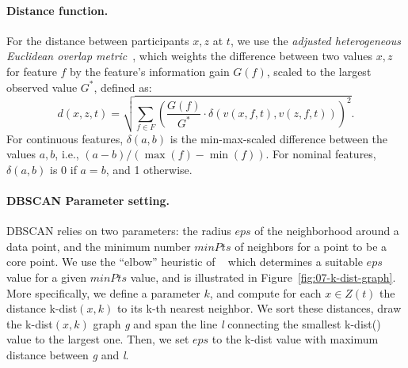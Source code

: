 \documentclass[
  oneside]{book}
\begin{document}
\paragraph*{Distance function.}

For the distance between participants \(x,z\) at \(t\), we use the \emph{adjusted heterogeneous Euclidean overlap metric}~\autocite{HielscherEtAl:IDA14,Wilson97}, which weights the difference between two values \(x,z\) for feature \(f\) by the feature's information gain \(G(f)\), scaled to the largest observed value \(G^*\), defined as:
\begin{equation}
d(x,z,t)=\sqrt{\sum_{f \in F} \left(\frac{G(f)}{G^*}\cdot \delta\left(v(x,f,t),v(z,f,t)\right)\right)^2}.
\label{eq:heom-adjusted}
\end{equation}
For continuous features, \(\delta(a,b)\) is the min-max-scaled difference between the values \(a,b\), i.e., \((a-b)/(\max(f)-\min(f))\).
For nominal features, \(\delta(a,b)\) is 0 if \(a=b\), and 1 otherwise.

\paragraph*{DBSCAN Parameter setting.}

DBSCAN relies on two parameters: the radius \(eps\) of the neighborhood around a data point, and the minimum number \(minPts\) of neighbors for a point to be a core point.
We use the ``elbow'' heuristic of ~\autocite{EsterEtAl:DBSCAN96} which determines a suitable \(eps\) value for a given \(minPts\) value, and is illustrated in Figure~\ref{fig:07-k-dist-graph}.
More specifically, we define a parameter \(k\), and compute for each \(x\in{}Z(t)\) the distance k-dist\((x,k)\) to its k-th nearest neighbor.
We sort these distances, draw the k-dist\((x,k)\) graph \emph{g} and span the line \emph{l} connecting the smallest k-dist() value to the largest one.
Then, we set \(eps\) to the k-dist value with maximum distance between \emph{g} and \emph{l}.
\end{document}
